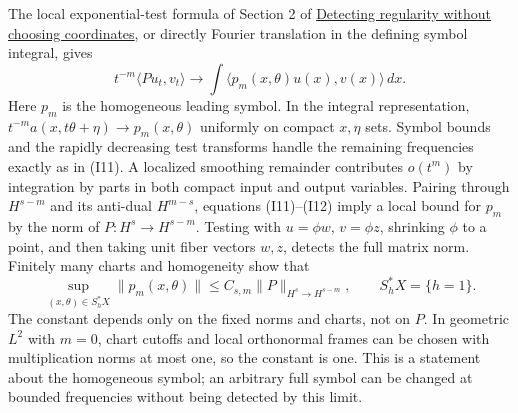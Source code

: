\documentclass[
  11pt,
]{article}
\begin{document}
The local exponential-test formula of Section 2 of
\href{geometric-microlocal-calculus.pdf}{Detecting regularity without
choosing coordinates}, or directly Fourier translation in the defining
symbol integral, gives \[
t^{-m}\langle Pu_t,v_t\rangle\longrightarrow
 \int\langle p_m(x,\theta)u(x),v(x)\rangle\,dx.
\tag{I12}
\] Here \(p_m\) is the homogeneous leading symbol. In the integral
representation, \(t^{-m}a(x,t\theta+\eta)\to p_m(x,\theta)\) uniformly
on compact \(x,\eta\) sets. Symbol bounds and the rapidly decreasing
test transforms handle the remaining frequencies exactly as in (I11). A
localized smoothing remainder contributes \(o(t^m)\) by integration by
parts in both compact input and output variables. Pairing through
\(H^{s-m}\) and its anti-dual \(H^{m-s}\), equations (I11)--(I12) imply
a local bound for \(p_m\) by the norm of \(P:H^s\to H^{s-m}\). Testing
with \(u=\phi w\), \(v=\phi z\), shrinking \(\phi\) to a point, and then
taking unit fiber vectors \(w,z\), detects the full matrix norm.
Finitely many charts and homogeneity show that \[
\sup_{(x,\theta)\in S_h^*X}\|p_m(x,\theta)\|
 \leq C_{s,m}\|P\|_{H^s\to H^{s-m}},
\qquad S_h^*X=\{h=1\}.
\tag{I13}
\] The constant depends only on the fixed norms and charts, not on
\(P\). In geometric \(L^2\) with \(m=0\), chart cutoffs and local
orthonormal frames can be chosen with multiplication norms at most one,
so the constant is one. This is a statement about the homogeneous
symbol; an arbitrary full symbol can be changed at bounded frequencies
without being detected by this limit.
\end{document}
